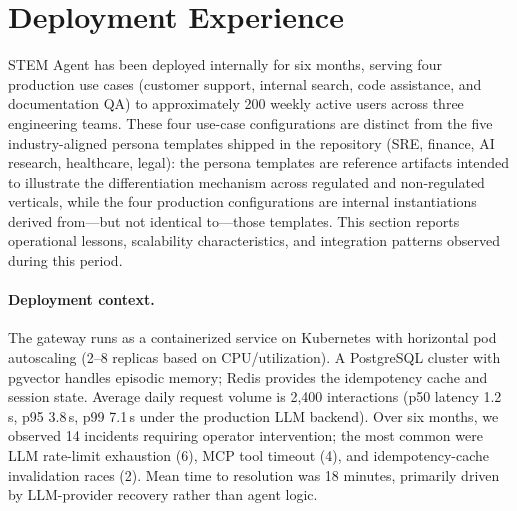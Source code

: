 \documentclass[11pt]{article}
\begin{document}
\section{Deployment Experience}
\label{sec:deployment}

STEM Agent has been deployed internally for six months, serving four production use cases (customer support, internal search, code assistance, and documentation QA) to approximately 200 weekly active users across three engineering teams. These four use-case configurations are distinct from the five industry-aligned persona templates shipped in the repository (SRE, finance, AI research, healthcare, legal): the persona templates are reference artifacts intended to illustrate the differentiation mechanism across regulated and non-regulated verticals, while the four production configurations are internal instantiations derived from---but not identical to---those templates. This section reports operational lessons, scalability characteristics, and integration patterns observed during this period.

\paragraph{Deployment context.} The gateway runs as a containerized service on Kubernetes with horizontal pod autoscaling (2--8 replicas based on CPU/utilization). A PostgreSQL cluster with pgvector handles episodic memory; Redis provides the idempotency cache and session state. Average daily request volume is 2,400 interactions (p50 latency 1.2\,s, p95 3.8\,s, p99 7.1\,s under the production LLM backend). Over six months, we observed 14 incidents requiring operator intervention; the most common were LLM rate-limit exhaustion (6), MCP tool timeout (4), and idempotency-cache invalidation races (2). Mean time to resolution was 18 minutes, primarily driven by LLM-provider recovery rather than agent logic.
\end{document}
